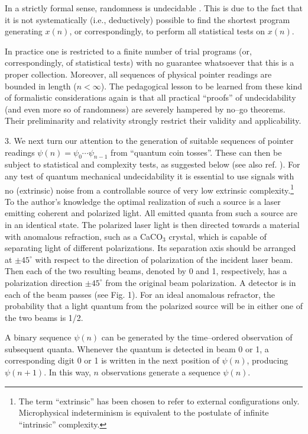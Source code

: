      In a strictly formal sense, randomness is undecidable
 \cite{chaitin1,chaitin2}.  This is due to the fact that it is not
 systematically (i.e., deductively) possible to find the shortest
 program generating $x(n)$, or correspondingly, to perform all
 statistical tests on $x(n)$.

      In practice one is restricted to a finite number of trial
 programs (or, correspondingly, of statistical tests) with no guarantee
 whatsoever that this is a proper collection.  Moreover, all sequences
 of physical pointer readings are bounded in length ($n<\infty$).  The
 pedagogical lesson to be learned from these kind of formalistic
 considerations again is that all practical ``proofs'' of
 undecidability
 (and even more so of randomness) are severely hampered by no--go
 theorems.  Their preliminarity and relativity strongly restrict their
 validity and applicability.

 3.
 We next turn our attention to the generation of suitable sequences of
 pointer readings $\psi (n)=\psi_0\cdots \psi_{n-1}$
  from ``quantum coin tosses''. These can then be subject to
 statistical and complexity tests, as suggested below (see also ref.
 \cite{eb1}).
 For any test of quantum mechanical undecidability it is
 essential to use signals with no (extrinsic) noise from a controllable
 source of very low extrinsic complexity.\footnote{
 The term ``extrinsic'' has been chosen to refer to external
 configurations only.  Microphysical indeterminism is equivalent to
 the postulate of infinite ``intrinsic'' complexity.}
 To the author's knowledge the
 optimal realization of such a source is a laser emitting coherent and
 polarized light.
 All emitted quanta from such a source are in an identical state.  The
 polarized laser
 light is then directed towards a material with anomalous refraction,
 such as a CaCO$_3$ crystal, which is capable of separating
 light of different polarizations.  Its separation axis should be
 arranged at $\pm 45^\circ$ with respect to the direction of
 polarization of the incident laser beam.  Then each of the two
 resulting beams, denoted by 0 and 1, respectively, has a polarization
 direction $\pm 45^\circ$ from the original beam polarization. A
 detector is in each of the beam passes (see Fig. 1). For an
 ideal anomalous refractor, the probability that a light quantum
 from the polarized source will be in either one of the two beams
 is 1/2.

 A binary sequence $\psi (n)$
 can be generated by the time--ordered observation of subsequent
 quanta.
 Whenever the quantum is detected in beam 0 or 1, a corresponding digit
 0 or 1 is written in the next position of $\psi (n)$,   producing
 $\psi (n+1)$. In this way, $n$
 observations generate a sequence \cite{bem} $\psi (n)$.

